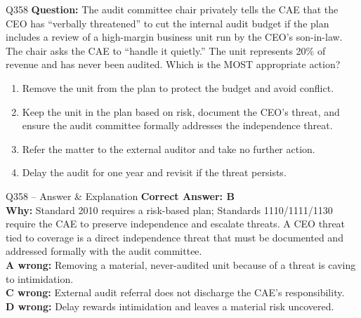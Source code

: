 \documentclass[aspectratio=169,10pt]{beamer}
\begin{document}
	\begin{frame}[t]{Q358}
		\small
		\textbf{Question:} The audit committee chair privately tells the CAE that the CEO has ``verbally threatened'' to cut the internal audit budget if the plan includes a review of a high-margin business unit run by the CEO's son-in-law. The chair asks the CAE to ``handle it quietly.'' The unit represents 20\% of revenue and has never been audited. Which is the MOST appropriate action?
		\begin{enumerate}[label=\Alph*.,itemsep=1pt,topsep=2pt]
			\item Remove the unit from the plan to protect the budget and avoid conflict.
			\item Keep the unit in the plan based on risk, document the CEO's threat, and ensure the audit committee formally addresses the independence threat.
			\item Refer the matter to the external auditor and take no further action.
			\item Delay the audit for one year and revisit if the threat persists.
		\end{enumerate}
	\end{frame}
	
	\begin{frame}[t]{Q358 -- Answer \& Explanation}
		\small
		\textbf{Correct Answer: B} \\[4pt]
		\textbf{Why:} Standard 2010 requires a risk-based plan; Standards 1110/1111/1130 require the CAE to preserve independence and escalate threats. A CEO threat tied to coverage is a direct independence threat that must be documented and addressed formally with the audit committee. \\[4pt]
		\textbf{A wrong:} Removing a material, never-audited unit because of a threat is caving to intimidation. \\[2pt]
		\textbf{C wrong:} External audit referral does not discharge the CAE's responsibility. \\[2pt]
		\textbf{D wrong:} Delay rewards intimidation and leaves a material risk uncovered.
	\end{frame}
	
\end{document}
